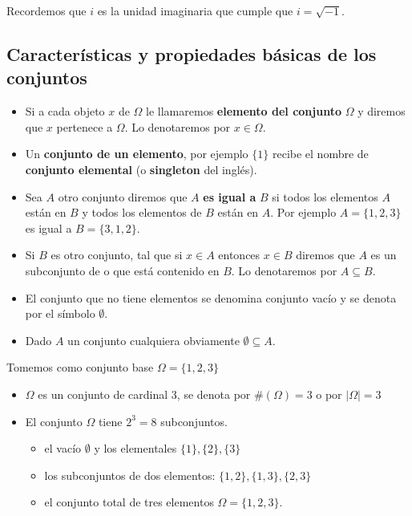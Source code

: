 \documentclass[
  letterpaper,
  DIV=11,
  numbers=noendperiod]{scrreprt}
\providecommand{\tightlist}{%
  \setlength{\itemsep}{0pt}\setlength{\parskip}{0pt}}\usepackage{longtable,booktabs,array}
\begin{document}
Recordemos que \(i\) es la unidad imaginaria que cumple que
\(i=\sqrt{-1}\).

\subsection{Características y propiedades básicas de los
conjuntos}\label{caracteruxedsticas-y-propiedades-buxe1sicas-de-los-conjuntos}

\begin{itemize}
\item
  Si a cada objeto \(x\) de \(\Omega\) le llamaremos \textbf{elemento
  del conjunto} \(\Omega\) y diremos que \(x\) pertenece a \(\Omega\).
  Lo denotaremos por \(x\in \Omega\).
\item
  Un \textbf{conjunto de un elemento}, por ejemplo \(\{1\}\) recibe el
  nombre de \textbf{conjunto elemental} (o \textbf{singleton} del
  inglés).
\item
  Sea \(A\) otro conjunto diremos que \(A\) \textbf{es igual a} \(B\) si
  todos los elementos \(A\) están en \(B\) y todos los elementos de
  \(B\) están en \(A\). Por ejemplo \(A=\{1,2,3\}\) es igual a
  \(B=\{3,1,2\}\).
\item
  Si \(B\) es otro conjunto, tal que si \(x\in A\) entonces \(x\in B\)
  diremos que \(A\) es un subconjunto de o que está contenido en \(B\).
  Lo denotaremos por \(A\subseteq B.\)
\item
  El conjunto que no tiene elementos se denomina conjunto vacío y se
  denota por el símbolo \(\emptyset\).
\item
  Dado \(A\) un conjunto cualquiera obviamente \(\emptyset\subseteq A.\)
\end{itemize}

Tomemos como conjunto base \(\Omega=\{1,2,3\}\)

\begin{itemize}
\tightlist
\item
  \(\Omega\) es un conjunto de cardinal 3, se denota por
  \(\#(\Omega)=3\) o por \(|\Omega|=3\)
\item
  El conjunto \(\Omega\) tiene \(2^3=8\) subconjuntos.

  \begin{itemize}
  \tightlist
  \item
    el vacío \(\emptyset\) y los elementales \(\{1\},\{2\},\{3\}\)
  \item
    los subconjuntos de dos elementos: \(\{1,2\},\{1,3\},\{2,3\}\)
  \item
    el conjunto total de tres elementos \(\Omega=\{1,2,3\}.\)
  \end{itemize}
\end{itemize}
\end{document}
